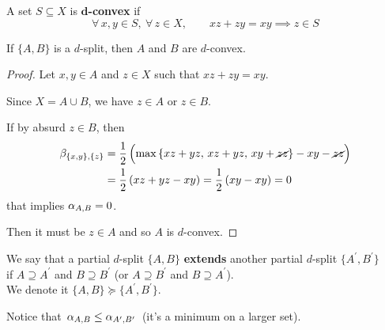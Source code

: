 \documentclass[./main.tex]{subfiles}
\begin{document}
\begin{definition}
    A set $S \subseteq X$ is \textbf{$\bm{d}$-convex} if
    \[ \forall\, x,y \in S,\ \forall\, z \in X, \qquad xz + zy = xy \implies z \in S \]
\end{definition}

\begin{proposition}
    If $\{A,B\}$ is a $d$-split, then $A$ and $B$ are $d$-convex.
\end{proposition}
\begin{proof}
    Let $x,y \in A$ and $z \in X$ such that $xz + zy = xy$.
    
    Since $X = A \cup B$, we have $z \in A$ or $z \in B$.
    
    If by absurd $z \in B$, then
    \begin{align*}
        \beta_{\{x,y\},\{z\}} &= \frac{1}{2}\, \Bigl( \max {\{ xz + yz,\, xz + yz,\, xy + \cancel{zz} \}} - xy - \cancel{zz} \Bigr) \\
        &= \frac{1}{2}\, (xz + yz - xy) = \frac{1}{2}\, (xy - xy) = 0
    \end{align*}
    that implies $\alpha_{A,B} = 0$. \absurd

    Then it must be $z \in A$ and so $A$ is $d$-convex.
\end{proof}

\clearpage

\begin{definition}
    We say that a partial $d$-split $\{A,B\}$ \textbf{extends} another partial $d$-split $\{A^\prime,B^\prime\}$ \\[2pt]
    \bsp if $A \supseteq A^\prime$ and $B \supseteq B^\prime$ (or $A \supseteq B^\prime$ and $B \supseteq A^\prime$). \\[2pt]
    We denote it $\{A,B\} \succcurlyeq \{A^\prime,B^\prime\}$.
    
    Notice that $\, \alpha_{A,B} \leq \alpha_{A^\prime,B^\prime} \,$ (it’s a minimum on a larger set).
\end{definition}
\end{document}
